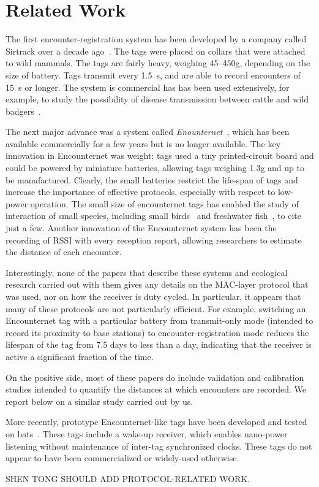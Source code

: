\section{Related Work}
\label{sec:related-work}

The first encounter-registration system has been developed by a company called Sirtrack 
over a decade ago~\cite{Prangle2006NewRadiocolars}. The tags
were placed on collars that were attached to wild mammals. The tags are fairly heavy, weighing 45--450g, depending on the
size of battery. Tags transmit every 1.5~s, and are able to record encounters of 15~s or longer. The system is
commercial has has been used extensively, for example, to study the possibility of disease transmission between cattle 
and wild badgers~\cite{Bohm2009WildlifeLivestock}.

The next major advance was a system called {\em Enounternet}~\cite{Menhill2012NovelTelemetry,Rutz2012AutomatedMapping}, 
which has been available commercially for a few years
but is no longer available. The key innovation in Encounternet was weight: tags used a tiny printed-circuit board and
could be powered by miniature batteries, allowing tags weighing 1.3g and up to be manufactured. Clearly, the small
batteries restrict the life-span of tags and increase the importance of effective protocols, especially with respect
to low-power operation. The small size of encounternet tags has enabled the study of interaction of small species, 
including small birds~\cite{Levin2015Performance} and freshwater fish~\cite{Tentelier2016FishNetwork}, to cite just a few.
Another innovation of the Encounternet system has been the recording of RSSI with every reception report, allowing
researchers to estimate the distance of each encounter. 

Interestingly, none of the papers that describe these systems and 
ecological research carried out with them gives any details on the
MAC-layer protocol that was used, nor on how the receiver is duty cycled. In particular, it appears that many of these 
protocols are not particularly efficient. For example, switching an Encounternet tag with a particular battery from
transmit-only mode (intended to record its proximity to base stations) to encounter-registration mode reduces the lifespan
of the tag from 7.5 days to less than a day, indicating that the receiver is active a significant fraction of the time.

On the positive side, most of these papers do include validation and calibration studies intended to quantify the distances
at which encounters are recorded. We report below on a similar study carried out by us.

More recently, prototype Encounternet-like tags have been developed and tested on
bats~\cite{Ripperger2016ProximitySensing,dressler2016bats}. These tags include a wake-up receiver, which
enables nano-power listening without maintenance of inter-tag synchronized clocks. These tags  
do not appear to have been commercialized or widely-used otherwise.

SHEN TONG SHOULD ADD PROTOCOL-RELATED WORK.


